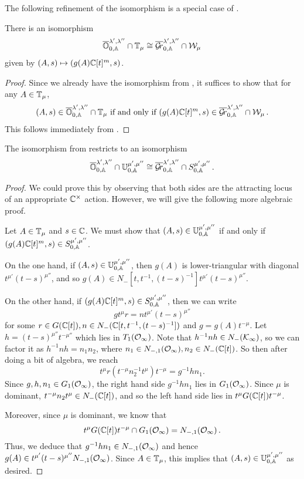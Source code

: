 \documentclass{article}
\begin{document}
The following refinement of the \mvy isomorphism is a special case of \cite[Theorem 5.3]{mirkovic2007quiver}. 
% 
\begin{theorem} 
\label{th:OGrl}
There is an isomorphism
$$
    \overline{\mathbb O}^{\lambda', \lambda''}_{0,\mathbb A} \cap \mathbb T_\mu \cong \overline{\mathcal{G}\!r}^{\lambda', \lambda''}_{0,\mathbb A} \cap \mathcal W_\mu 
$$
given by $ (A,s) \mapsto (g(A)\mathbb C[t]^m, s)$.
\end{theorem}
% 
\begin{proof}
Since we already have the isomorphism from , it suffices to show that for any $ A \in \mathbb T_\mu$, 
$$ 
    (A,s) \in \overline{\mathbb O}^{\lambda', \lambda''}_{0,\mathbb A} \cap \mathbb T_\mu \text{ if and only if } (g(A)\mathbb C[t]^m, s) \in \overline{\mathcal{G}\!r}^{\lambda', \lambda''}_{0,\mathbb A} \cap \mathcal W_\mu \,. 
$$
This follows immediately from .
\end{proof}
% 
\begin{theorem}
\label{th:OTGrW}
The isomorphism from  restricts to an isomorphism
$$ 
    \overline{\mathbb O}^{\lambda', \lambda''}_{0,\mathbb A} \cap \mathbb U^{\mu', \mu''}_{0,\mathbb A} \cong \overline{\mathcal{G}\!r}^{\lambda', \lambda''}_{0,\mathbb A} \cap S^{\mu', \mu''}_{0,\mathbb A}\,.
$$
\end{theorem}
% 
\begin{proof}
We could prove this by observing that both sides are the attracting locus of an appropriate $ {\mathbb C^\times}$ action. However, we will give the following more algebraic proof.

Let $ A \in \mathbb T_\mu$ and $ s \in \mathbb C $. We must show that  $ (A,s) \in \mathbb U^{\mu', \mu''}_{0,\mathbb A} $ if and only if $ (g(A)\mathbb C[t]^m,s) \in S^{\mu', \mu''}_{0,\mathbb A} $. 

On the one hand, if $ (A,s) \in \mathbb U^{\mu', \mu''}_{0,\mathbb A} $, then $ g(A)$ is lower-triangular with diagonal $ t^{\mu'} (t-s)^{\mu''}$, and so $ g(A) \in N_-[t, t^{-1}, (t-s)^{-1}] t^{\mu'} (t-s)^{\mu''}$. 

On the other hand, if $ (g(A)\mathbb C[t]^m, s) \in S^{\mu', \mu''}_{0,\mathbb A}$, then we can write 
$$
    g t^\mu r= n t^{\mu'} (t-s)^{\mu''}
$$
for some $ r \in G(\mathbb C[t]), n \in N_-(\mathbb C[t, t^{-1}, (t-s)^{-1}]) $ and $ g = g(A)t^{-\mu}$.  Let $ h = (t-s)^{\mu''} t^{-\mu''}$ which lies in $ T_1(\mathcal O_\infty) $. 
Note that $ h^{-1}n h \in N_-(\mathcal K_\infty)$, so we can factor it as $ h^{-1} n h  = n_1 n_2 $, where $ n_1 \in N_{-,1}(\mathcal O_\infty), n_2 \in N_-(\mathbb C[t])$.  So then after doing a bit of algebra, we reach
$$
    t^\mu r (t^{-\mu} n_2^{-1} t^\mu) t^{-\mu} = g^{-1} h n_1.
$$
Since $ g, h, n_1 \in G_1(\mathcal O_\infty)$, the right hand side $ g^{-1} h n_1 $ lies in $ G_1(\mathcal O_\infty) $.  Since $ \mu $ is dominant, $ t^{-\mu} n_2 t^\mu \in N_-(\mathbb C[t])$, and so the left hand side lies in $t^\mu G(\mathbb C[t]) t^{-\mu}$.

Moreover, since $ \mu $ is dominant, we know that 
$$
    t^\mu G(\mathbb C[t]) t^{-\mu} \cap G_1(\mathcal O_\infty) = N_{-,1}(\mathcal O_\infty)\,.
$$
Thus, we deduce that $ g^{-1} h n_1 \in N_{-,1}(\mathcal O_\infty)$ and hence $ g(A) \in t^{\mu'} (t-s)^{\mu''}N_{-,1}(\mathcal O_\infty) $. Since $ A \in \mathbb T_\mu $, this implies that $ (A,s) \in \mathbb U^{\mu', \mu''}_{0,\mathbb A}$ as desired.
\end{proof}
\end{document}
